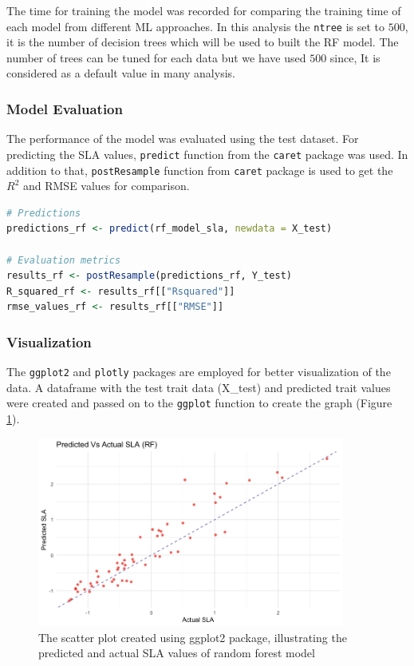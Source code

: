\documentclass[12pt,a4paper]{report}
\begin{document}
The time for training the model was recorded for comparing the training time of each model from different ML approaches. In this analysis the \texttt{ntree} is set to $500$, it is the number of decision trees which will be used to built the RF model. The number of trees can be tuned for each data but we have used $500$ since, It is considered as a default value in many analysis. \\

\subsubsection*{Model Evaluation}
The performance of the model was evaluated using the test dataset. For predicting the SLA values, \texttt{predict} function from the \texttt{caret} package was used. In addition to that, \texttt{postResample} function from \texttt{caret} package is used to get the $R^2$ and RMSE values for comparison.\\

\begin{lstlisting}[language=R, style=mystyle]
# Predictions
predictions_rf <- predict(rf_model_sla, newdata = X_test)

# Evaluation metrics
results_rf <- postResample(predictions_rf, Y_test)
R_squared_rf <- results_rf[["Rsquared"]]
rmse_values_rf <- results_rf[["RMSE"]]
\end{lstlisting}

\subsubsection*{Visualization}
The \texttt{ggplot2} and \texttt{plotly} packages are employed for better visualization of the data. A dataframe with the test trait data (X\_test) and predicted trait values were created and passed on to the \texttt{ggplot} function to create the graph (Figure \ref{fig:sla_rf}).\\

\begin{figure}[h]
    \centering
    \includegraphics[width=0.9\textwidth]{Figures/sla_rf.png}
    \caption{The scatter plot created using ggplot2 package, illustrating the predicted and actual SLA values of random forest model}
    \label{fig:sla_rf}
\end{figure}
\end{document}
